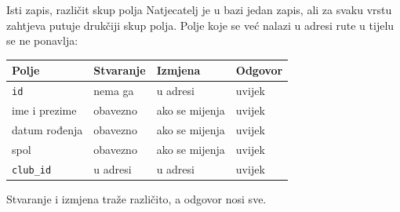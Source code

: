
\begin{frame}{Isti zapis, različit skup polja}
Natjecatelj je u bazi jedan zapis, ali za svaku vrstu zahtjeva putuje drukčiji skup polja. Polje koje se već nalazi u adresi rute u tijelu se ne ponavlja:

\vspace{0.3em}
\begin{center}
{\small
\setlength{\tabcolsep}{0pt}
\renewcommand{\arraystretch}{1.18}
\begin{tabular}{@{}L{3.3cm}L{2.7cm}L{3.0cm}L{2.0cm}@{}}
  \toprule
  \textbf{Polje} & \textbf{Stvaranje} & \textbf{Izmjena} & \textbf{Odgovor} \\
  \midrule
  \texttt{id}       & nema ga   & u adresi       & uvijek \\
  ime i prezime     & obavezno  & ako se mijenja & uvijek \\
  datum rođenja     & obavezno  & ako se mijenja & uvijek \\
  spol              & obavezno  & ako se mijenja & uvijek \\
  \texttt{club\_id} & u adresi  & u adresi       & uvijek \\
  \bottomrule
\end{tabular}
}
\end{center}

\vspace{0.3em}
Stvaranje i izmjena traže različito, a odgovor nosi sve.
\end{frame}

